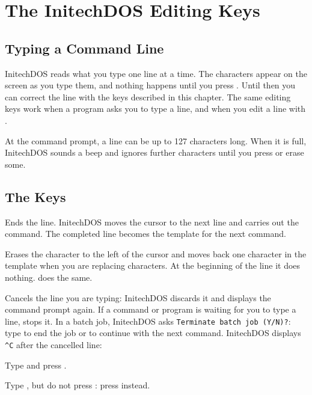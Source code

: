 \chapter{The InitechDOS Editing Keys}

\section{Typing a Command Line}
InitechDOS reads what you type one line at a time. The characters appear on
 the screen as you type them, and nothing happens until you press
. Until then you can correct the line with the keys described
in this chapter. The same editing keys work when a program asks you to
type a line, and when you edit a line with .

At the command prompt, a line can be up to 127 characters long. When it is
full, InitechDOS sounds a beep and ignores further characters until you
press  or erase some.

\section{The Keys}
Ends the line. InitechDOS moves the cursor to the next
line and carries out the command. The completed line becomes the template
for the next command.

Erases the character to the left of the cursor and
moves back one character in the template when you are replacing characters.
At the beginning of the line it does nothing.  does the same.

Cancels the line you are typing: InitechDOS discards it
and displays the command prompt again. If a command or program is waiting
for you to type a line,  stops it.  In a batch job, InitechDOS
asks \texttt{Terminate batch job (Y/N)?}: type  to end the job
or  to continue with the next command.
InitechDOS displays \texttt{\textasciicircum C} after the cancelled line:
\begin{Steps}
\item Type  and press .
\item Type , but do not press : press 
  instead.
\end{Steps}

